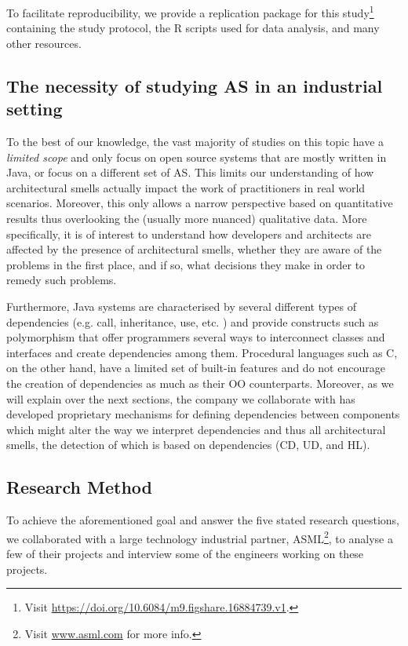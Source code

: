 To facilitate reproducibility, we provide a replication package for this study\footnote{Visit \url{https://doi.org/10.6084/m9.figshare.16884739.v1}.} 
containing the study protocol, the R scripts used for data analysis, and many other resources.

\subsection{The necessity of studying AS in an industrial setting}
To the best of our knowledge, the vast majority of studies on this topic have a \emph{limited scope} and only focus on open source systems that are mostly written in Java, or focus on a different set of AS.
This limits our understanding of how architectural smells actually impact the work of practitioners in real world scenarios.
Moreover, this only allows a narrow perspective based on quantitative results thus overlooking the (usually more nuanced) qualitative data. 
More specifically, it is of interest to understand how developers and architects are affected by the presence of architectural smells, whether they are aware of the problems in the first place, and if so, what decisions they make in order to remedy such problems.

Furthermore, Java systems are characterised by several different types of dependencies (e.g. call, inheritance, use, etc. \cite{Pruijt2017}) and provide constructs such as polymorphism that offer programmers several ways to interconnect classes and interfaces and create dependencies among them.
Procedural languages such as C, on the other hand, have a limited set of built-in features and do not encourage the creation of dependencies as much as their OO counterparts.
Moreover, as we will explain over the next sections, the company we collaborate with has developed proprietary mechanisms for defining dependencies between components which might alter the way we interpret dependencies and thus all architectural smells, the detection of which is based on dependencies (CD, UD, and HL).

\subsection{Research Method}
To achieve the aforementioned goal and answer the five stated research questions, we collaborated with a large technology industrial partner, ASML\footnote{Visit \url{www.asml.com} for more info.}, to analyse a few of their projects and interview some of the engineers working on these projects. 

